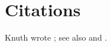 \section{Citations}
Knuth wrote \cite{knuth1984}; see also \cite[ch.~2]{lamport1994} and
\cite{knuth1984,lamport1994}.
